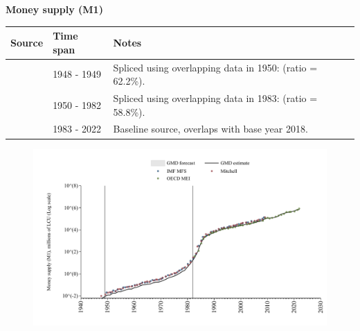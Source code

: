 \documentclass[12pt,a4paper,landscape]{article}
\begin{document}
\begin{adjustbox}{max totalsize={\paperwidth}{\paperheight},center}
\begin{minipage}[t][\textheight][t]{\textwidth}
\vspace*{0.5cm}
{}
\begin{center}
{\Large\bfseries Money supply (M1)}
\end{center}
\vspace{0.5cm}
\begin{table}[H]
\centering
\small
\begin{tabular}{|l|l|l|}
\hline
\textbf{Source} & \textbf{Time span} & \textbf{Notes} \\
\hline
\rowcolor{white}\cite{Mitchell}& 1948 - 1949 &Spliced using overlapping data in 1950: (ratio = 62.2\%). \\
\rowcolor{lightgray}\cite{IMF_MFS}& 1950 - 1982 &Spliced using overlapping data in 1983: (ratio = 58.8\%). \\
\rowcolor{white}\cite{OECD_MEI}& 1983 - 2022 &Baseline source, overlaps with base year 2018. \\
\hline
\end{tabular}
\end{table}
\begin{figure}[H]
\centering
\includegraphics[width=\textwidth,height=0.6\textheight,keepaspectratio]{graphs/ISR_M1.pdf}
\end{figure}
\end{minipage}
\end{adjustbox}
\end{document}
